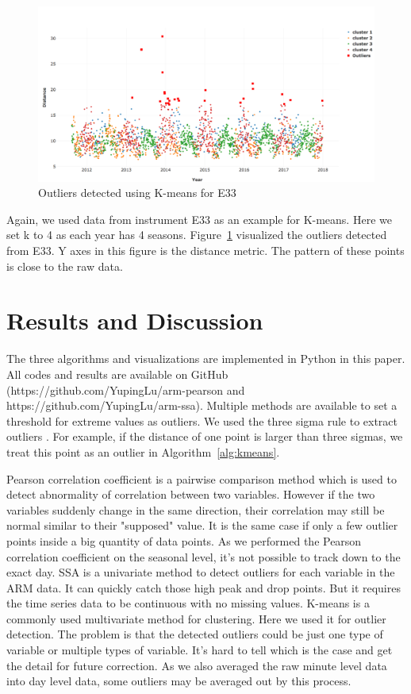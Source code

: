 \documentclass[letterpaper, 10 pt, conference]{ieeeconf}  %
\begin{document}
\begin{figure}[ht]
    \centering
    \includegraphics[width=\textwidth]{kmeans.png}
    \caption{Outliers detected using K-means for E33}
    \label{fig:kmeans}
\end{figure}

Again, we used data from instrument E33 as an example for K-means. Here we set k to 4 as each year has 4 seasons.  Figure~\ref{fig:kmeans} visualized the outliers detected from E33. Y axes in this figure is the distance metric. The pattern of these points is close to the raw data.

\section{Results and Discussion}
The three algorithms and visualizations are implemented in Python in this paper. All codes and results are available on GitHub (https://github.com/YupingLu/arm-pearson and https://github.com/YupingLu/arm-ssa). Multiple methods are available to set a threshold for extreme values as outliers. We used the three sigma rule to extract outliers \cite{pukelsheim1994three}. For example, if the distance of one point is larger than three sigmas, we treat this point as an outlier in Algorithm~\ref{alg:kmeans}.

Pearson correlation coefficient is a pairwise comparison method which is used to detect abnormality of correlation between two variables. However if the two variables suddenly change in the same direction, their correlation may still be normal similar to their "supposed" value. It is the same case if only a few outlier points inside a big quantity of data points. As we performed the Pearson correlation coefficient on the seasonal level, it's not possible to track down to the exact day. SSA is a univariate method to detect outliers for each variable in the ARM data. It can quickly catch those high peak and drop points. But it requires the time series data to be continuous with no missing values. K-means is a commonly used multivariate method for clustering. Here we used it for outlier detection. The problem is that the detected outliers could be just one type of variable or multiple types of variable. It's hard to tell which is the case and get the detail for future correction. As we also averaged the raw minute level data into day level data, some outliers may be averaged out by this process.
\end{document}
